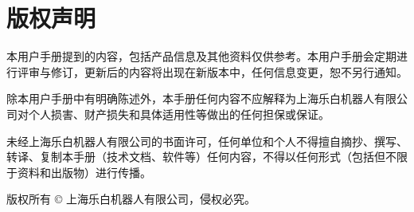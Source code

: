 \chapter*{版权声明}

本用户手册提到的内容，包括产品信息及其他资料仅供参考。本用户手册会定期进行评审与修订，更新后的内容将出现在新版本中，任何信息变更，恕不另行通知。

除本用户手册中有明确陈述外，本手册任何内容不应解释为上海乐白机器人有限公司对个人损害、财产损失和具体适用性等做出的任何担保或保证。 

未经上海乐白机器人有限公司的书面许可，任何单位和个人不得擅自摘抄、撰写、转译、复制本手册（技术文档、软件等）任何内容，不得以任何形式（包括但不限于资料和出版物）进行传播。 

版权所有 © 上海乐白机器人有限公司，侵权必究。

